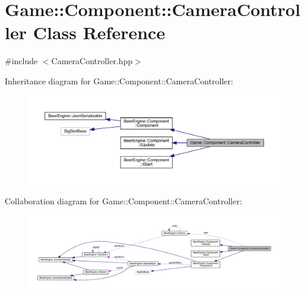 \hypertarget{class_game_1_1_component_1_1_camera_controller}{}\section{Game\+:\+:Component\+:\+:Camera\+Controller Class Reference}
\label{class_game_1_1_component_1_1_camera_controller}


{\ttfamily \#include $<$Camera\+Controller.\+hpp$>$}



Inheritance diagram for Game\+:\+:Component\+:\+:Camera\+Controller\+:
\nopagebreak
\begin{figure}[H]
\begin{center}
\leavevmode
\includegraphics[width=350pt]{class_game_1_1_component_1_1_camera_controller__inherit__graph}
\end{center}
\end{figure}


Collaboration diagram for Game\+:\+:Component\+:\+:Camera\+Controller\+:
\nopagebreak
\begin{figure}[H]
\begin{center}
\leavevmode
\includegraphics[width=350pt]{class_game_1_1_component_1_1_camera_controller__coll__graph}
\end{center}
\end{figure}
